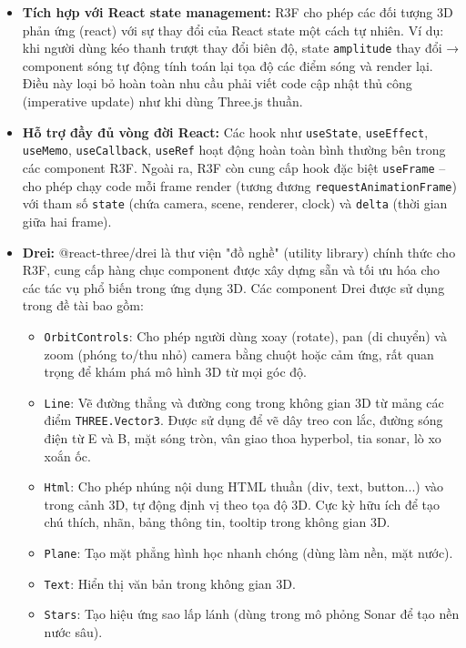 \begin{itemize}
    \item \textbf{Tích hợp với React state management:} R3F cho phép các đối tượng 3D phản ứng (react) với sự thay đổi của React state một cách tự nhiên. Ví dụ: khi người dùng kéo thanh trượt thay đổi biên độ, state \texttt{amplitude} thay đổi → component sóng tự động tính toán lại tọa độ các điểm sóng và render lại. Điều này loại bỏ hoàn toàn nhu cầu phải viết code cập nhật thủ công (imperative update) như khi dùng Three.js thuần.
    
    \item \textbf{Hỗ trợ đầy đủ vòng đời React:} Các hook như \texttt{useState}, \texttt{useEffect}, \texttt{useMemo}, \texttt{useCallback}, \texttt{useRef} hoạt động hoàn toàn bình thường bên trong các component R3F. Ngoài ra, R3F còn cung cấp hook đặc biệt \texttt{useFrame} – cho phép chạy code mỗi frame render (tương đương \texttt{requestAnimationFrame}) với tham số \texttt{state} (chứa camera, scene, renderer, clock) và \texttt{delta} (thời gian giữa hai frame).
    
    \item \textbf{Drei:} @react-three/drei là thư viện "đồ nghề" (utility library) chính thức cho R3F, cung cấp hàng chục component được xây dựng sẵn và tối ưu hóa cho các tác vụ phổ biến trong ứng dụng 3D. Các component Drei được sử dụng trong đề tài bao gồm:
    \begin{itemize}
        \item \texttt{OrbitControls}: Cho phép người dùng xoay (rotate), pan (di chuyển) và zoom (phóng to/thu nhỏ) camera bằng chuột hoặc cảm ứng, rất quan trọng để khám phá mô hình 3D từ mọi góc độ.
        \item \texttt{Line}: Vẽ đường thẳng và đường cong trong không gian 3D từ mảng các điểm \texttt{THREE.Vector3}. Được sử dụng để vẽ dây treo con lắc, đường sóng điện từ E và B, mặt sóng tròn, vân giao thoa hyperbol, tia sonar, lò xo xoắn ốc.
        \item \texttt{Html}: Cho phép nhúng nội dung HTML thuần (div, text, button...) vào trong cảnh 3D, tự động định vị theo tọa độ 3D. Cực kỳ hữu ích để tạo chú thích, nhãn, bảng thông tin, tooltip trong không gian 3D.
        \item \texttt{Plane}: Tạo mặt phẳng hình học nhanh chóng (dùng làm nền, mặt nước).
        \item \texttt{Text}: Hiển thị văn bản trong không gian 3D.
        \item \texttt{Stars}: Tạo hiệu ứng sao lấp lánh (dùng trong mô phỏng Sonar để tạo nền nước sâu).
    \end{itemize}
\end{itemize}

